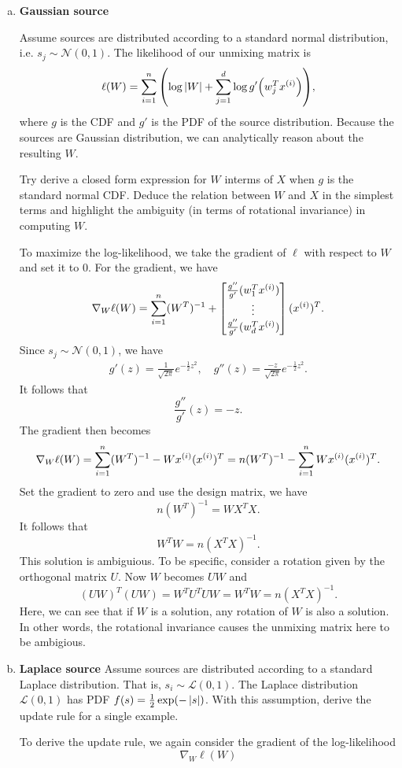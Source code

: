 \documentclass[12pt,letterpaper,boxed]{hmcpset}
\begin{document}
\begin{solution}
  \begin{enumerate}[(a)]
    \item \textbf{Gaussian source}
    
    Assume sources are distributed according to a standard normal distribution, i.e. $s_j \sim \mathcal{N}(0,1)$. The likelihood of our unmixing matrix is
    \[
    \ell(W) = \sum_{i=1}^n \qty(\log \abs{W} + \sum_{j=1}^d \log g' \qty(w_j^T \xx)),
    \]
    where $g$ is the CDF and $g'$ is the PDF of the source distribution. Because the sources are Gaussian distribution, we can analytically reason about the resulting $W$.

    Try derive a closed form expression for $W$ interms of $X$ when $g$ is the standard normal CDF. Deduce the relation between $W$ and $X$ in the simplest terms and highlight the ambiguity (in terms of rotational invariance) in computing $W$.

    To maximize the log-likelihood, we take the gradient of $\ell$ with respect to $W$ and set it to $0$. For the gradient, we have
    \[
    \nabla_W \ell(W) = \sum_{i=1}^n (W^{T})^{-1} + \begin{bmatrix}
      \frac{g''}{g'} (w_1^T \xx) \\
      \vdots \\
      \frac{g''}{g'} (w_d^T \xx)
    \end{bmatrix}
    (\xx)^T.
    \]
    Since $s_j \sim \mathcal N(0,1)$, we have
    \[
    \begin{aligned}
      g'(z) = \frac{1}{\sqrt{2\pi}} e^{-\frac{1}{2} z^2}, \quad
      g''(z) = \frac{-z}{\sqrt{2\pi}} e^{-\frac{1}{2} z^2}.
    \end{aligned}
    \]
    It follows that
    \[
    \frac{g''}{g'}(z) = -z.
    \]
    The gradient then becomes
    \[
    \nabla_W \ell(W) = \sum_{i=1}^n (W^{T})^{-1} - W \xx (\xx)^T = n (W^{T})^{-1} - \sum_{i=1}^n W \xx (\xx)^T.
    \]
    Set the gradient to zero and use the design matrix, we have
    \[
    n (W^T)^{-1} = W X^T X.
    \]
    It follows that 
    \[
    W^T W = n (X^T X)^{-1}.
    \]
    This solution is ambiguious. To be specific, consider a rotation given by the orthogonal matrix $U$. Now $W$ becomes $UW$ and 
    \[
    (UW)^T (UW) = W^T U^T U W = W^T W = n (X^T X)^{-1}.
    \]
    Here, we can see that if $W$ is a solution, any rotation of $W$ is also a solution. In other words, the rotational invariance causes the unmixing matrix here to be ambigious.

    \item \textbf{Laplace source}
    Assume sources are distributed according to a standard Laplace distribution. That is, $s_i \sim \mathcal L(0,1)$. The Laplace distribution $\mathcal{L} (0,1)$ has PDF $f(s) = \frac{1}{2} \exp(- \left\lvert s\right\rvert)$. With this assumption, derive the update rule for a single example.

    To derive the update rule, we again consider the gradient of the log-likelihood 
    \[
    \nabla_W \ell(W)
    \]
  \end{enumerate}
\end{solution}
\end{document}
